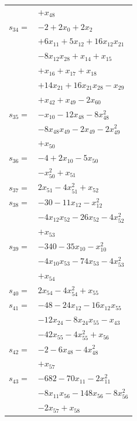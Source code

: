 \begin{longtable}{@{}r@{\;}l@{}}
 & \(\displaystyle +x_{48}\) \\[3pt]
\(s_{34}=\) & \(\displaystyle -2 +2x_{0} +2x_{2}\) \\
 & \(\displaystyle +6x_{11} +5x_{12} +16x_{12}x_{21}\) \\
 & \(\displaystyle -8x_{12}x_{28} +x_{14} +x_{15}\) \\
 & \(\displaystyle +x_{16} +x_{17} +x_{18}\) \\
 & \(\displaystyle +14x_{21} +16x_{21}x_{28} -x_{29}\) \\
 & \(\displaystyle +x_{42} +x_{49} -2x_{60}\) \\[3pt]
\(s_{35}=\) & \(\displaystyle -x_{10} -12x_{48} -8x_{48}^{2}\) \\
 & \(\displaystyle -8x_{48}x_{49} -2x_{49} -2x_{49}^{2}\) \\
 & \(\displaystyle +x_{50}\) \\[3pt]
\(s_{36}=\) & \(\displaystyle -4 +2x_{10} -5x_{50}\) \\
 & \(\displaystyle -x_{50}^{2} +x_{51}\) \\[3pt]
\(s_{37}=\) & \(\displaystyle 2x_{51} -4x_{51}^{2} +x_{52}\) \\[3pt]
\(s_{38}=\) & \(\displaystyle -30 -11x_{12} -x_{12}^{2}\) \\
 & \(\displaystyle -4x_{12}x_{52} -26x_{52} -4x_{52}^{2}\) \\
 & \(\displaystyle +x_{53}\) \\[3pt]
\(s_{39}=\) & \(\displaystyle -340 -35x_{10} -x_{10}^{2}\) \\
 & \(\displaystyle -4x_{10}x_{53} -74x_{53} -4x_{53}^{2}\) \\
 & \(\displaystyle +x_{54}\) \\[3pt]
\(s_{40}=\) & \(\displaystyle 2x_{54} -4x_{54}^{2} +x_{55}\) \\[3pt]
\(s_{41}=\) & \(\displaystyle -48 -24x_{12} -16x_{12}x_{55}\) \\
 & \(\displaystyle -12x_{24} -8x_{24}x_{55} -x_{43}\) \\
 & \(\displaystyle -42x_{55} -4x_{55}^{2} +x_{56}\) \\[3pt]
\(s_{42}=\) & \(\displaystyle -2 -6x_{48} -4x_{48}^{2}\) \\
 & \(\displaystyle +x_{57}\) \\[3pt]
\(s_{43}=\) & \(\displaystyle -682 -70x_{11} -2x_{11}^{2}\) \\
 & \(\displaystyle -8x_{11}x_{56} -148x_{56} -8x_{56}^{2}\) \\
 & \(\displaystyle -2x_{57} +x_{58}\) \\[3pt]

\end{longtable}
